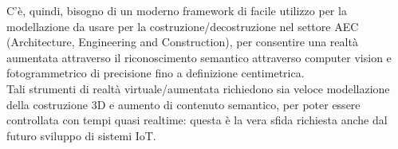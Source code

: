 C'è, quindi, bisogno di un moderno framework di facile utilizzo per la modellazione da usare per la
costruzione/decostruzione nel settore AEC (Architecture, Engineering and Construction),
per consentire una realtà aumentata attraverso il riconoscimento semantico attraverso computer vision e
fotogrammetrico di precisione fino a definizione centimetrica.\\
Tali strumenti di realtà virtuale/aumentata
richiedono sia veloce modellazione della costruzione 3D e aumento di contenuto semantico, per poter essere controllata con
tempi quasi realtime: questa è la vera sfida richiesta anche dal futuro sviluppo di sistemi IoT.
\newpage
